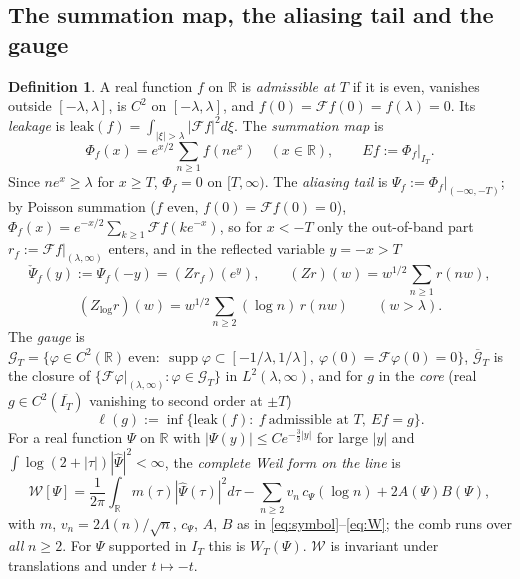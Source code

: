 \documentclass[11pt]{amsart}
\theoremstyle{definition}
\newtheorem{definition}[theorem]{Definition}
\theoremstyle{remark}
\newcommand{\R}{\mathbb R}
\newcommand{\supp}{\operatorname{supp}}
\newcommand{\IT}{I_T}
\begin{document}
\subsection{The summation map, the aliasing tail and the gauge}\label{subsec:ext-defs}

\begin{definition}\label{def:ext}
A real function $f$ on $\R$ is \emph{admissible at $T$} if it is even, vanishes outside $[-\lambda,\lambda]$, is $C^2$ on
$[-\lambda,\lambda]$, and $f(0)=\mathcal Ff(0)=f(\lambda)=0$. Its \emph{leakage} is
$\mathrm{leak}(f)=\int_{|\xi|>\lambda}|\mathcal Ff|^2d\xi$. The \emph{summation map} is
\[
\Phi_f(x)=e^{x/2}\sum_{n\ge1}f(ne^x)\quad(x\in\R),\qquad Ef:=\Phi_f|_{\IT}.
\]
Since $ne^x\ge\lambda$ for $x\ge T$, $\Phi_f=0$ on $[T,\infty)$. The \emph{aliasing tail} is $\Psi_f:=\Phi_f|_{(-\infty,-T)}$;
by Poisson summation ($f$ even, $f(0)=\mathcal Ff(0)=0$), $\Phi_f(x)=e^{-x/2}\sum_{k\ge1}\mathcal Ff(ke^{-x})$, so for $x<-T$
only the out-of-band part $r_f:=\mathcal Ff|_{(\lambda,\infty)}$ enters, and in the reflected variable $y=-x>T$
\[
\check\Psi_f(y):=\Psi_f(-y)=(Zr_f)(e^y),\qquad (Zr)(w)=w^{1/2}\sum_{n\ge1}r(nw),
\]
\[
(Z_{\log}r)(w)=w^{1/2}\sum_{n\ge2}(\log n)\,r(nw)\qquad(w>\lambda).
\]
The \emph{gauge} is $\mathcal G_T=\{\varphi\in C^2(\R)\ \text{even}:\ \supp\varphi\subset[-1/\lambda,1/\lambda],\
\varphi(0)=\mathcal F\varphi(0)=0\}$, $\overline{\mathcal G}_T$ is the closure of $\{\mathcal F\varphi|_{(\lambda,\infty)}:\varphi\in\mathcal G_T\}$
in $L^2(\lambda,\infty)$, and for $g$ in the \emph{core} (real $g\in C^2(\overline{\IT})$ vanishing to second order at $\pm T$)
\[
\ell(g):=\inf\{\mathrm{leak}(f):\ f\ \text{admissible at }T,\ Ef=g\}.
\]
For a real function $\Psi$ on $\R$ with $|\Psi(y)|\le Ce^{-\frac32|y|}$ for large $|y|$ and $\int\log(2+|\tau|)|\widehat\Psi|^2<\infty$,
the \emph{complete Weil form on the line} is
\[
\mathcal W[\Psi]=\frac1{2\pi}\int_\R m(\tau)|\widehat\Psi(\tau)|^2d\tau-\sum_{n\ge2}v_n\,c_\Psi(\log n)+2A(\Psi)B(\Psi),
\]
with $m$, $v_n=2\Lambda(n)/\sqrt n$, $c_\Psi$, $A$, $B$ as in \eqref{eq:symbol}--\eqref{eq:W}; the comb runs over \emph{all}
$n\ge2$. For $\Psi$ supported in $\IT$ this is $W_T(\Psi)$. $\mathcal W$ is invariant under translations and under
$t\mapsto-t$.
\end{definition}
\end{document}
